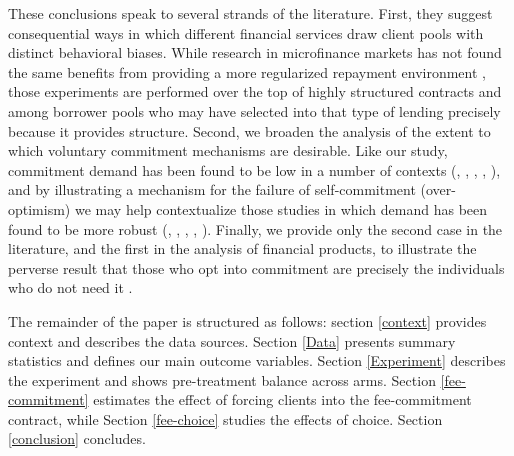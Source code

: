 \documentclass[oneside,11pt]{article}
\begin{document}
These conclusions speak to several strands of the literature.  First, they suggest consequential ways in which different financial services draw client pools with distinct behavioral biases.  While research in microfinance markets has not found the same benefits from providing a more regularized repayment environment \citep{Pande}, those experiments are performed over the top of highly structured contracts and among borrower pools who may have selected into that type of lending precisely because it provides structure.  Second, we broaden the analysis of the extent to which voluntary commitment mechanisms are desirable.  Like our study, commitment demand has been found to be low in a number of contexts (\cite{Ashraf}, \cite{Gine}, \cite{Ted}, \cite{Royer}, \cite{Sprenger}), and by illustrating a mechanism for the failure of self-commitment (over-optimism) we may help contextualize those studies in which demand has been found to be more robust (\cite{Kremer},  \cite{Casaburi}, \cite{Alcohol}, \cite{AprajitP&P}, \cite{Pascaline}). Finally, we provide only the second case in the literature, and the first in the analysis of financial products, to illustrate the perverse result that those who opt into commitment are precisely the individuals who do not need it \citep{Sprenger}.


The remainder of the paper is structured as follows:  section \ref{context} provides context and describes the data sources. Section \ref{Data} presents summary statistics and defines our main outcome variables. Section \ref{Experiment} describes the experiment and shows pre-treatment balance across arms. Section \ref{fee-commitment} estimates the effect of forcing clients into the fee-commitment contract, while Section \ref{fee-choice} studies the effects of choice. Section \ref{conclusion} concludes.




\end{document}

